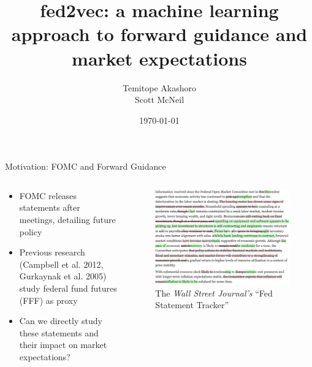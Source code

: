 \documentclass{beamer}
\title{fed2vec: a machine learning approach to forward guidance and market expectations}
\author{Temitope Akashoro\\
		Scott McNeil}
\date{\today}
\begin{document}
\begin{frame}
  \titlepage
\end{frame}


\begin{frame}{Motivation: FOMC and Forward Guidance}

\begin{columns}
	\begin{column}{0.5\textwidth}
		\begin{itemize}
			\item FOMC releases statements after meetings, detailing future policy
			\item Previous research (Campbell et al. 2012, Gurkaynak et al. 2005) study federal fund futures (FFF) as proxy
			\item Can we directly study these statements and their impact on market expectations?
		\end{itemize}
	\end{column}
	\begin{column}{0.5\textwidth}
		\begin{figure}
			\includegraphics[width=1.05\textwidth]{fomcstatement.png}
			\caption{The \emph{Wall Street Journal's} \textquotedblleft Fed Statement Tracker\textquotedblright}
		\end{figure}
	\end{column}
\end{columns}

\end{frame}
\end{document}
